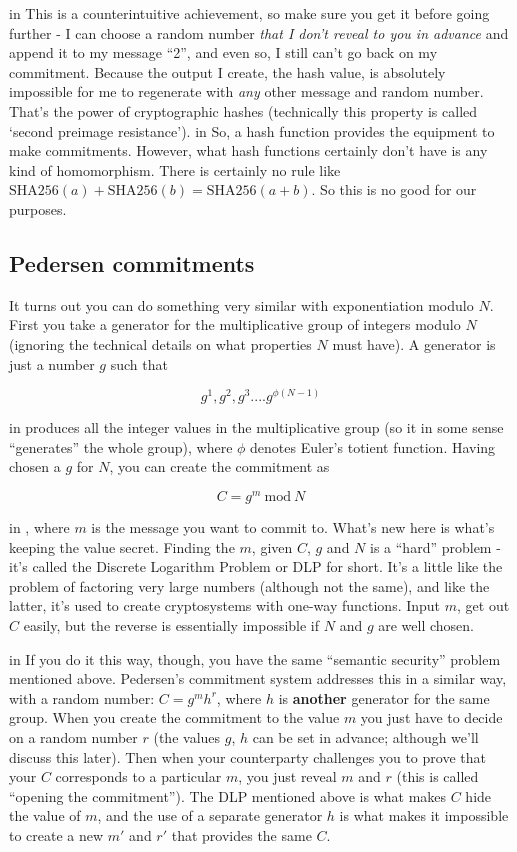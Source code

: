 \documentclass[10pt,a4paper]{article}
\begin{document}
 in \noindent This is a counterintuitive achievement, so make sure you get it before going further - I can choose a random number \textit{that I don't reveal to you in advance} and append it to my message ``2'', and even so, I still can't go back on my commitment. Because the output I create, the hash value, is absolutely impossible for me to regenerate with \textit{any} other message and random number. That's the power of cryptographic hashes (technically this property is called `second preimage resistance').
 in \noindent So, a hash function provides the equipment to make commitments. However, what hash functions certainly don't have is any kind of homomorphism. There is certainly no rule like $\textrm{SHA256}(a) + \textrm{SHA256}(b) = \textrm{SHA256}(a+b)$. So this is no good for our purposes.

\subsection{Pedersen commitments}

It turns out you can do something very similar with exponentiation modulo $N$. First you take a generator for the multiplicative group of integers modulo $N$ (ignoring the technical details on what properties $N$ must have). A generator is just a number $g$ such that

\[g^1, g^2, g^3 .... g^{\phi(N-1)} \]

 in \noindent produces all the integer values in the multiplicative group (so it in some sense ``generates'' the whole group), where $\phi$ denotes Euler's totient function. Having chosen a $g$ for $N$, you can create the commitment as

\[C = g^m \ \textrm{mod}\ N \]

 in \noindent , where $m$ is the message you want to commit to. What's new here is what's keeping the value secret. Finding the $m$, given $C$, $g$ and $N$ is a ``hard'' problem - it's called the Discrete Logarithm Problem or DLP for short. It's a little like the problem of factoring very large numbers (although not the same), and like the latter, it's used to create cryptosystems with one-way functions. Input $m$, get out $C$ easily, but the reverse is essentially impossible if $N$ and $g$ are well chosen.

 in \noindent If you do it this way, though, you have the same ``semantic security'' problem mentioned above. Pedersen's commitment system addresses this in a similar way, with a random number: $C = g^m h^r$, where $h$ is \textbf{another} generator for the same group. When you create the commitment to the value $m$ you just have to decide on a random number $r$ (the values $g$, $h$ can be set in advance; although we'll discuss this later). Then when your counterparty challenges you to prove that your $C$ corresponds to a particular $m$, you just reveal $m$ and $r$ (this is called ``opening the commitment''). The DLP mentioned above is what makes $C$ hide the value of $m$, and the use of a separate generator $h$ is what makes it impossible to create a new $m'$ and $r'$ that provides the same $C$.
\end{document}
